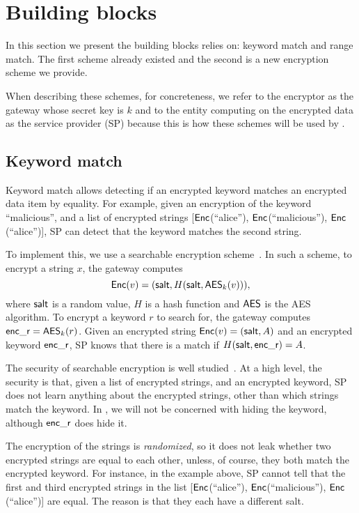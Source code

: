 


\section{Building blocks}

In this section we present the building blocks \sys relies on: keyword match and range match. The first scheme already existed and the second is a new encryption scheme we provide. 

When describing these schemes, for concreteness, we refer to the encryptor as the gateway whose secret key is $k$ and to the entity computing on the encrypted data as the service provider (SP) because this is how these schemes will be used by \sys.


\subsection{Keyword match}\label{s:kwmatch}


Keyword match allows detecting if an encrypted keyword matches an encrypted data item by equality.
For example, given an encryption of the keyword ``malicious'', and a list of encrypted strings  [$\mathsf{Enc}$(``alice''), $\mathsf{Enc}$(``malicious''), $\mathsf{Enc}$(``alice'')], SP can  detect that the keyword matches the second string. 

To implement this, we use a searchable encryption scheme~\cite{song:search, blindbox}.
In such a scheme, 
to encrypt a string $x$, the gateway computes 
\begin{equation}
\mathsf{Enc}(v) = (\mathsf{salt}, H(\mathsf{salt}, \mathsf{AES}_k(v))), \label{eq:KWMatchEnc}
\end{equation}
where $\mathsf{salt}$ is a random value, $H$ is a hash function and $\mathsf{AES}$ is the AES algorithm.
To encrypt a keyword $r$ to search for, the gateway computes $\mathsf{enc\_r} = \mathsf{AES}_k(r)$. 
Given an encrypted string $\mathsf{Enc}(v) = (\mathsf{salt}, A)$ and an encrypted keyword $\mathsf{enc\_r}$, SP knows that there is a match if  $H(\mathsf{salt}, \mathsf{enc\_r}) = A$.  

 The security of searchable encryption is well studied~\cite{song:search, blindbox}. At a high level, the security is that, given a list of encrypted strings, and an encrypted keyword, SP does not learn anything about the encrypted strings, other than which strings match the keyword. In \sys, we will not be concerned with hiding the keyword, although $\mathsf{enc\_r}$ does hide it. 

 The encryption of the strings is {\em randomized}, so it does not leak whether two encrypted strings are equal to each other, unless, of course, they both match the encrypted keyword. For instance, in the example above, SP cannot tell that the first and third encrypted strings 
in the list [$\mathsf{Enc}$(``alice''), $\mathsf{Enc}$(``malicious''), $\mathsf{Enc}$(``alice'')] are equal. The reason is that they each have a different salt.  

